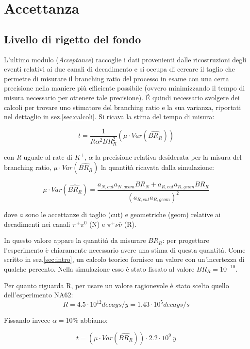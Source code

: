 \documentclass[8pt]{extarticle}
\begin{document}
\section{Accettanza} \label{sec:acceptance}
\subsection{Livello di rigetto del fondo} \label{subsec:rejection}
L'ultimo modulo (\textit{Acceptance}) raccoglie i dati provenienti dalle ricostruzioni degli eventi relativi ai due canali di decadimento e si occupa di cercare il taglio che permette di misurare il branching ratio del processo in esame con una certa precisione nella maniere più efficiente possibile (ovvero minimizzando il tempo di misura necessario per ottenere tale precisione). \'E quindi necessario svolgere dei calcoli per trovare uno stimatore del branching ratio e la sua varianza, riportati nel dettaglio in sez.\ref{sec:calcoli}. Si ricava la stima del tempo di misura:

$$
t = \frac{1}{R \alpha^2 BR_R^2} (\mu \cdot Var(\widehat{BR_R}))
$$

con \textit{R} uguale al rate di $K^+$, $\alpha$ la precisione relativa desiderata per la misura del branching ratio, $\mu \cdot Var(\widehat{BR_R})$ la quantità ricavata dalla simulazione: 

\begin{equation}
\mu \cdot Var(\widehat{BR_R}) = \frac{a_{N,cut}a_{N,geom}BR_N + a_{R,cut}a_{R,geom}BR_R}{(a_{R,cut}a_{R,geom})^2}
\end{equation}

dove $a$ sono le accettanze di taglio (cut) e geometriche (geom) relative ai decadimenti nei canali $\pi^+ \pi^0$ (N) e $\pi^+ \nu \bar{\nu}$ (R).

In questo valore appare la quantità da misurare $BR_R$: per progettare l'esperimento è chiaramente necessario avere una stima di questa quantità. Come scritto in sez.\ref{sec:intro}, un calcolo teorico fornisce un valore con un'incertezza di qualche percento\cite{br teorico}. Nella simulazione esso è stato fissato al valore $BR_R = 10^{-10}$.

Per quanto riguarda R, per usare un valore ragionevole è stato scelto quello dell'esperimento NA62\cite{NA62 flux}:
$$
R = 4.5 \cdot 10^{12} decays/y = 1.43 \cdot 10^5 decays/s
$$

Fissando invece $\alpha = 10\%$ abbiamo:

$$
t = (\mu \cdot Var(\widehat{BR_R})) \cdot 2.2 \cdot 10^9\ y
$$
\end{document}
